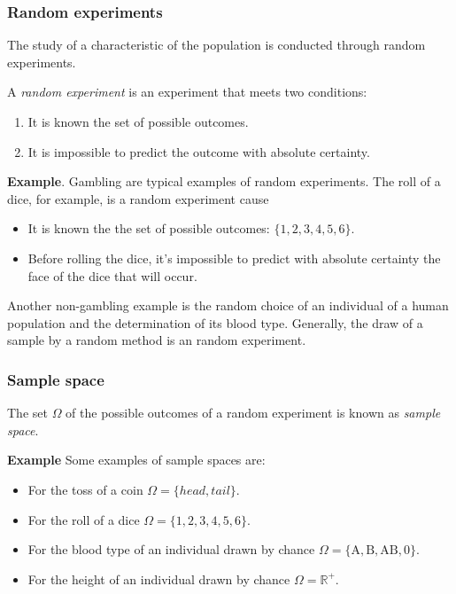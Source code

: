 \begin{frame}
\frametitle{Random experiments}
The study of a characteristic of the population is conducted through random experiments. 

\begin{definition} A \emph{random experiment} is an experiment that meets two conditions:
\begin{enumerate}
\item It is known the set of possible outcomes. 
\item It is impossible to predict the outcome with absolute certainty.
\end{enumerate} 
\end{definition}

\textbf{Example}. Gambling are typical examples of random experiments. 
The roll of a dice, for example, is a random experiment cause
\begin{itemize}
\item It is known the the set of possible outcomes: $\{1,2,3,4,5,6\}$.
\item Before rolling the dice, it's impossible to predict with absolute certainty the face of the dice that will occur. 
\end{itemize}

Another non-gambling example is the random choice of an individual of a human population and the determination of its
blood type. 
Generally, the draw of a sample by a random method  is an random experiment.
\end{frame}


\begin{frame}
\frametitle{Sample space}
\begin{definition}
The set $\Omega$ of the possible outcomes of a random experiment is known as \emph{sample space}.
\end{definition}

\textbf{Example} Some examples of sample spaces are:
\begin{itemize}
\item For the toss of a coin $\Omega=\{head,tail\}$.
\item For the roll of a dice $\Omega=\{1,2,3,4,5,6\}$.
\item For the blood type of an individual drawn by chance $\Omega=\{\mbox{A},\mbox{B},\mbox{AB},\mbox{0}\}$.
\item For the height of an individual drawn by chance $\Omega=\mathbb{R}^+$.
\end{itemize}
\end{frame}


